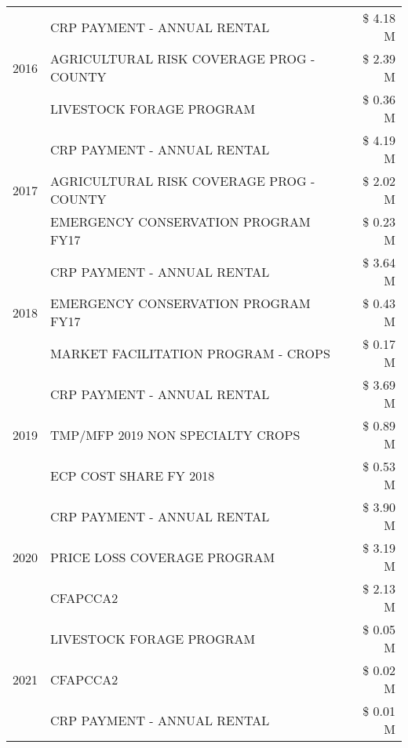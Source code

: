 \begin{tabular}{llr}
\cline{1-3}
\multirow[t]{3}{*}{2016} & CRP PAYMENT - ANNUAL RENTAL & \$ 4.18 M \\
 & AGRICULTURAL RISK COVERAGE PROG - COUNTY & \$ 2.39 M \\
 & LIVESTOCK FORAGE PROGRAM & \$ 0.36 M \\
\cline{1-3}
\multirow[t]{3}{*}{2017} & CRP PAYMENT - ANNUAL RENTAL & \$ 4.19 M \\
 & AGRICULTURAL RISK COVERAGE PROG - COUNTY & \$ 2.02 M \\
 & EMERGENCY CONSERVATION PROGRAM FY17 & \$ 0.23 M \\
\cline{1-3}
\multirow[t]{3}{*}{2018} & CRP PAYMENT - ANNUAL RENTAL & \$ 3.64 M \\
 & EMERGENCY CONSERVATION PROGRAM FY17 & \$ 0.43 M \\
 & MARKET FACILITATION PROGRAM - CROPS & \$ 0.17 M \\
\cline{1-3}
\multirow[t]{3}{*}{2019} & CRP PAYMENT - ANNUAL RENTAL & \$ 3.69 M \\
 & TMP/MFP 2019 NON SPECIALTY CROPS & \$ 0.89 M \\
 & ECP COST SHARE FY 2018 & \$ 0.53 M \\
\cline{1-3}
\multirow[t]{3}{*}{2020} & CRP PAYMENT - ANNUAL RENTAL & \$ 3.90 M \\
 & PRICE LOSS COVERAGE PROGRAM & \$ 3.19 M \\
 & CFAPCCA2 & \$ 2.13 M \\
\cline{1-3}
\multirow[t]{3}{*}{2021} & LIVESTOCK FORAGE PROGRAM & \$ 0.05 M \\
 & CFAPCCA2 & \$ 0.02 M \\
 & CRP PAYMENT - ANNUAL RENTAL & \$ 0.01 M \\
\cline{1-3}
\bottomrule
\end{tabular}
